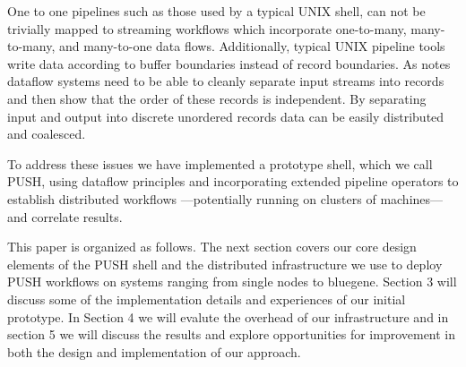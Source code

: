 One to one pipelines such as those used by a typical UNIX shell,
can not be trivially mapped to streaming workflows which incorporate
one-to-many, many-to-many, and many-to-one data flows.  Additionally,
typical UNIX pipeline tools write data according to buffer boundaries
instead of record boundaries.  As \cite{pike2005idp} notes dataflow
systems need to be able to cleanly separate input streams into
records and then show that the order of these records is independent.
By separating input and output into discrete unordered records data
can be easily distributed and coalesced.

To address these issues we have implemented a prototype shell, which
we call PUSH, using dataflow principles and incorporating extended
pipeline operators to establish distributed workflows ---potentially
running on clusters of machines--- and correlate results.  
%
%

This paper is organized as follows. The next section 
covers our core design elements of the PUSH shell and the distributed
infrastructure we use to deploy PUSH workflows on systems ranging from
single nodes to bluegene.  Section 3 will discuss some of the implementation
details and experiences of our initial prototype.  In Section 4 we will 
evalute the overhead of our infrastructure and in section 5 we will discuss
the results and explore opportunities for improvement in both the design
and implementation of our approach.

